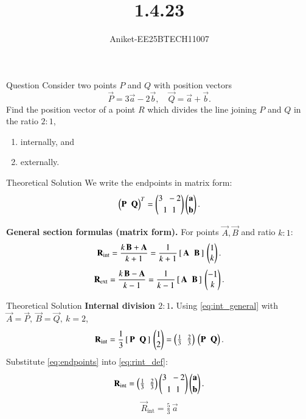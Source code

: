 \documentclass{beamer}
\title %
{1.4.23}
\author %
{Aniket-EE25BTECH11007}
\begin{document}
\frame{\titlepage}
\begin{frame}{Question}
Consider two points $P$ and $Q$ with position vectors 
\[
\vec{P} = 3\vec{a} - 2\vec{b}, \quad \vec{Q} = \vec{a} + \vec{b}.
\]
Find the position vector of a point $R$ which divides the line joining $P$ and $Q$ in the ratio $2:1$,
\begin{enumerate}
    \item internally, and 
    \item externally.
\end{enumerate}
\end{frame}

\begin{frame}{Theoretical Solution}
\noindent We write the endpoints in matrix form:
\begin{equation}
\begin{pmatrix}\mathbf P \;\; \mathbf Q\end{pmatrix}^{T}
=
\begin{pmatrix}3 \;\; -2 \\[2pt] 1 \;\; 1\end{pmatrix}
\begin{pmatrix}\mathbf a \\[2pt] \mathbf b\end{pmatrix}.
\label{eq:endpoints}
\end{equation}

\noindent \textbf{General section formulas (matrix form).}
For points \(\vec A,\vec B\) and ratio \(k:1\):
\begin{equation}
\mathbf R_{\text{int}}
=\frac{k\,\mathbf B+\mathbf A}{k+1}
=\frac{1}{k+1}\,[\,\mathbf A\;\;\mathbf B\,]\,
\begin{pmatrix}1\\ k\end{pmatrix}.
\label{eq:int_general}
\end{equation}
\begin{equation}
\mathbf R_{\text{ext}}
=\frac{k\,\mathbf B-\mathbf A}{k-1}
=\frac{1}{k-1}\,[\,\mathbf A\;\;\mathbf B\,]\,
\begin{pmatrix}-1\\ k\end{pmatrix}.
\label{eq:ext_general}
\end{equation}
\end{frame}
\begin{frame}{Theoretical Solution}
\noindent \textbf{Internal division \(2:1\).}
Using \eqref{eq:int_general} with \(\vec A=\vec P,\ \vec B=\vec Q,\ k=2\),
\begin{equation}
\mathbf R_{\text{int}}
=\frac{1}{3}\,[\,\mathbf P\;\;\mathbf Q\,]\,
\begin{pmatrix}1\\ 2\end{pmatrix}
=\begin{pmatrix}\tfrac13 \;\; \tfrac23\end{pmatrix}\, \begin{pmatrix}\mathbf P \;\; \mathbf Q\end{pmatrix}.
\label{eq:rint_def}
\end{equation}
Substitute \eqref{eq:endpoints} into \eqref{eq:rint_def}:
\begin{equation}
\mathbf R_{\text{int}}
=
\begin{pmatrix}\tfrac13 \;\; \tfrac23\end{pmatrix}
\begin{pmatrix}3 \;\; -2 \\[2pt] 1 \;\; 1\end{pmatrix}
\begin{pmatrix}\mathbf a \\[2pt] \mathbf b\end{pmatrix}.
\label{eq:rint_sub}
\end{equation}
\begin{equation}
\boxed{\;\vec R_{\text{int}}=\tfrac{5}{3}\,\vec a\;}
\label{eq:rint_final}
\end{equation}
\end{frame}
\end{document}
